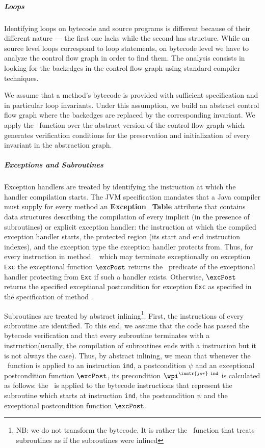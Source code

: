 \subparagraph*{Loops}

Identifying loops on bytecode and source programs is different because of their different nature --- 
the first one lacks while the second has structure. While on source level loops correspond to loop statements,  
on bytecode level we have to analyze the control flow graph in order to find them.
 The analysis consists in looking for the backedges in the control flow graph using standard compiler techniques. 
  
 We assume that a method's bytecode is provided with sufficient specification and in particular loop invariants.
 Under this assumption, we build an abstract control flow graph where the backedges are replaced by
 the corresponding invariant. We apply the \wpi \ function over the abstract version of the control flow graph which generates verification conditions for the 
preservation and initialization of every invariant in the abstraction graph. 


     

\subparagraph*{Exceptions and Subroutines}
Exception handlers are treated by identifying the instruction at which the handler compilation starts. The JVM specification mandates 
that a Java compiler must supply for every method an \textbf{Exception\_Table} attribute that contains data structures describing the compilation of every implicit (in the presence of subroutines) or explicit exception handler: the instruction at which the compiled exception handler starts,
 the protected region (its start and end instruction indexes), and the exception type the exception handler protects from. Thus, 
for every instruction  in method \method~ which may terminate exceptionally on exception \texttt{Exc} the exceptional function
 $\excPost$  returns the \wpi \ predicate of the exceptional handler protecting  from \texttt{Exc} if such a handler exists.
Otherwise, $\excPost$ returns the specified exceptional postcondition for exception \texttt{Exc} as specified in the specification of
method \method.

Subroutines are treated by abstract inlining\footnote{NB: we do not transform the bytecode. It is rather the \wpi \
 function that treats subroutines as if the subroutines were inlined}. First, the instructions of every subroutine
 are identified. %
To this end, we assume that the code has passed the bytecode verification and that every subroutine terminates with a  
instruction(usually, the compilation of subroutines ends with a \instr{ret} instruction but it is not always the case). Thus, by abstract inlining, we mean that
 whenever the \wpi~function is applied to an instruction \instr{jsr}  \texttt{ind}, a postcondition $\psi$ and an exceptional postcondition function $\excPost$, its precondition  $\wpi^{\instr{jsr} \ \tt{ind}}$ is calculated as follows: the \wpi \ is applied to the bytecode instructions that represent the subroutine which starts at instruction \texttt{ind},
 the postcondition $\psi$ and the exceptional postcondition function  $\excPost$.





